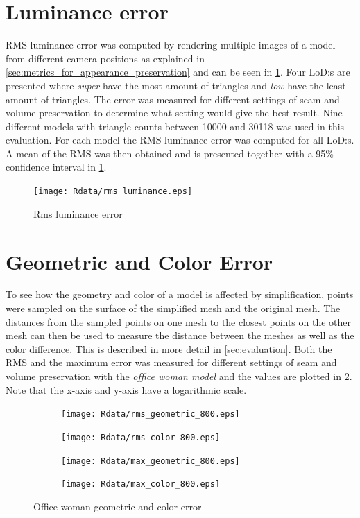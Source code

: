 \section{Luminance error}
RMS luminance error was computed by rendering multiple images of a model from different camera positions as explained in \cref{sec:metrics_for_appearance_preservation} and can be seen in \cref{fig:mean_luminance_error}. Four LoD:s are presented where \emph{super} have the most amount of triangles and \emph{low} have the least amount of triangles. The error was measured for different settings of seam and volume preservation to determine what setting would give the best result. Nine different models with triangle counts between 10000 and 30118 was used in this evaluation. For each model the RMS luminance error was computed for all LoD:s. A mean of the RMS was then obtained and is presented together with a 95\% confidence interval in \cref{fig:mean_luminance_error}.

\begin{figure}[ht]
  \centering
  \texttt{[image: Rdata/rms\_luminance.eps]}
  \caption{Rms luminance error}
  \label{fig:mean_luminance_error}
\end{figure}

\clearpage



 
\section{Geometric and Color Error}
To see how the geometry and color of a model is affected by simplification, points were sampled on the surface of the simplified mesh and the original mesh. The distances from the sampled points on one mesh to the closest points on the other mesh can then be used to measure the distance between the meshes as well as the color difference. This is described in more detail in \cref{sec:evaluation}. Both the RMS and the maximum error was measured for different settings of seam and volume preservation with the \emph{office woman model} and the values are plotted in \cref{fig:geo_col_error}. Note that the x-axis and y-axis have a logarithmic scale.

\begin{figure}[ht]
  \centering
  \begin{subfigure}[b]{.49\textwidth}
    \texttt{[image: Rdata/rms\_geometric\_800.eps]}
  \end{subfigure}
  \hfill
  \begin{subfigure}[b]{.49\textwidth}
    \right
    \texttt{[image: Rdata/rms\_color\_800.eps]}
  \end{subfigure}

  \begin{subfigure}[b]{.49\textwidth}
    \texttt{[image: Rdata/max\_geometric\_800.eps]}
  \end{subfigure}
  \hfill
  \begin{subfigure}[b]{.49\textwidth}
    \texttt{[image: Rdata/max\_color\_800.eps]}
  \end{subfigure}
  \caption{Office woman geometric and color error}
  \label{fig:geo_col_error}
\end{figure}

